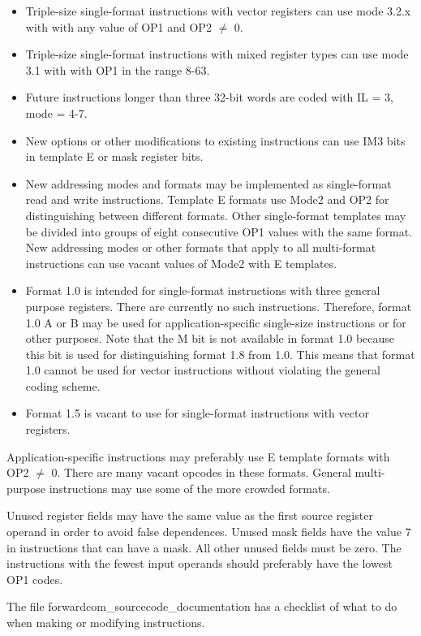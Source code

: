 \documentclass[forwardcom.tex]{subfiles}
\begin{document}
\begin{itemize}
\item Triple-size single-format instructions with vector registers can use mode 3.2.x with with any value of OP1 and OP2 $\neq$ 0.

\item Triple-size single-format instructions with mixed register types can use mode 3.1 with with OP1 in the range 8-63.


\item Future instructions longer than three 32-bit words are coded with IL = 3, mode = 4-7.

\item New options or other modifications to existing instructions can use IM3 bits in template E or mask register bits.

\item New addressing modes and formats may be implemented as single-format read and write instructions. Template E formats use Mode2 and OP2 for distinguishing between different formats. 
Other single-format templates may be divided into groups of eight consecutive OP1 values with the same format.
New addressing modes or other formats that apply to all multi-format instructions can use vacant values of Mode2 with E templates.

\item Format 1.0 is intended for single-format instructions with three general purpose registers. There are currently no such instructions. Therefore, format 1.0 A or B may be used for application-specific single-size instructions or for other purposes. Note that the M bit is not available in format 1.0 because this bit is used for distinguishing format 1.8 from 1.0. This means that format 1.0 cannot be used for vector instructions without violating the general coding scheme.

\item Format 1.5 is vacant to use for single-format instructions with vector registers.

\end{itemize}

Application-specific instructions may preferably use E template formats with OP2 $\neq$ 0. There are many vacant opcodes in these formats. General multi-purpose instructions may use some of the more crowded formats.
\vspace{2mm}

Unused register fields may have the same value as the first source register operand in order to avoid false dependences. Unused mask fields have the value 7 in instructions that can have a mask.
All other unused fields must be zero. The instructions with the fewest input operands should preferably have the lowest OP1 codes. 
\vspace{2mm}

The file forwardcom\_sourcecode\_documentation has a checklist of what to do when making or modifying instructions.
\vspace{2mm}
\end{document}
